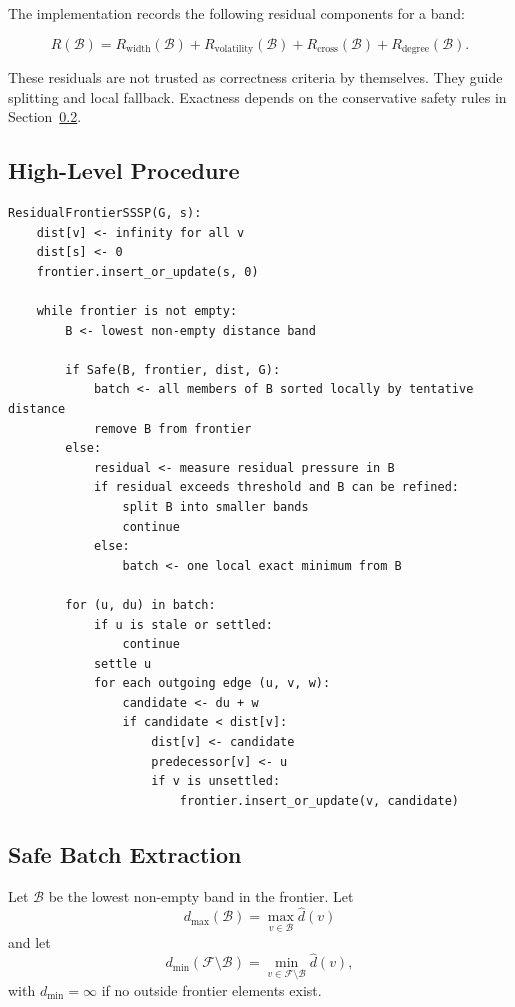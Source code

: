 \documentclass[11pt]{article}
\newcommand{\frontier}{\mathcal{F}}
\newcommand{\band}{\mathcal{B}}
\begin{document}
The implementation records the following residual components for a band:

\[
  R(\band)=R_{\text{width}}(\band)+R_{\text{volatility}}(\band)+R_{\text{cross}}(\band)+R_{\text{degree}}(\band).
\]

These residuals are not trusted as correctness criteria by themselves. They guide splitting and local fallback. Exactness depends on the conservative safety rules in Section~\ref{sec:safety}.

\subsection{High-Level Procedure}

\begin{verbatim}
ResidualFrontierSSSP(G, s):
    dist[v] <- infinity for all v
    dist[s] <- 0
    frontier.insert_or_update(s, 0)

    while frontier is not empty:
        B <- lowest non-empty distance band

        if Safe(B, frontier, dist, G):
            batch <- all members of B sorted locally by tentative distance
            remove B from frontier
        else:
            residual <- measure residual pressure in B
            if residual exceeds threshold and B can be refined:
                split B into smaller bands
                continue
            else:
                batch <- one local exact minimum from B

        for (u, du) in batch:
            if u is stale or settled:
                continue
            settle u
            for each outgoing edge (u, v, w):
                candidate <- du + w
                if candidate < dist[v]:
                    dist[v] <- candidate
                    predecessor[v] <- u
                    if v is unsettled:
                        frontier.insert_or_update(v, candidate)
\end{verbatim}

\subsection{Safe Batch Extraction}
\label{sec:safety}

Let $\band$ be the lowest non-empty band in the frontier. Let
\[
  d_{\max}(\band)=\max_{v\in \band} \hat d(v)
\]
and let
\[
  d_{\min}(\frontier\setminus \band)=\min_{v\in \frontier\setminus \band} \hat d(v),
\]
with $d_{\min}=\infty$ if no outside frontier elements exist.
\end{document}
